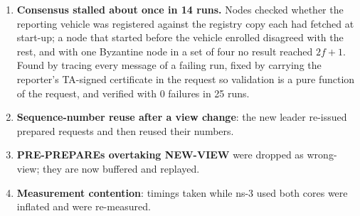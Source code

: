 \begin{enumerate}
\item \textbf{Consensus stalled about once in 14 runs.} Nodes checked whether
the reporting vehicle was registered against the registry copy each had
fetched at start-up; a node that started before the vehicle enrolled
disagreed with the rest, and with one Byzantine node in a set of four no
result reached $2f+1$. Found by tracing every message of a failing run, fixed
by carrying the reporter's TA-signed certificate in the request so validation
is a pure function of the request, and verified with 0 failures in 25 runs.
\item \textbf{Sequence-number reuse after a view change}: the new leader
re-issued prepared requests and then reused their numbers.
\item \textbf{PRE-PREPAREs overtaking NEW-VIEW} were dropped as wrong-view;
they are now buffered and replayed.
\item \textbf{Measurement contention}: timings taken while ns-3 used both
cores were inflated and were re-measured.
\end{enumerate}
